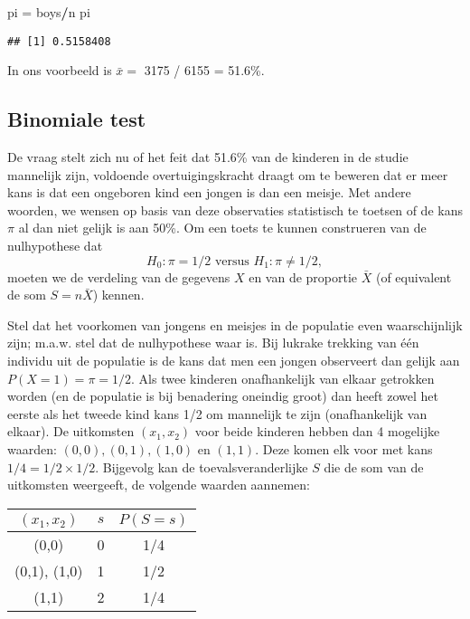 \documentclass[12pt,dutch,coursenotes]{book}
\newenvironment{Shaded}{\begin{snugshade}}{\end{snugshade}}
\newcommand{\StringTok}[1]{\textcolor[rgb]{0.31,0.60,0.02}{#1}}
\newcommand{\OperatorTok}[1]{\textcolor[rgb]{0.81,0.36,0.00}{\textbf{#1}}}
\newcommand{\NormalTok}[1]{#1}
\theoremstyle{definition}
\theoremstyle{definition}
\theoremstyle{definition}
\theoremstyle{remark}
\begin{document}
\begin{Shaded}
\begin{Highlighting}[]
\NormalTok{pi =}\StringTok{ }\NormalTok{boys}\OperatorTok{/}\NormalTok{n}
\NormalTok{pi}
\end{Highlighting}
\end{Shaded}

\begin{verbatim}
## [1] 0.5158408
\end{verbatim}

In ons voorbeeld is \(\bar x =\) 3175 / 6155 = 51.6\%.

\subsection{Binomiale test}\label{subsec:binom}

De vraag stelt zich nu of het feit dat 51.6\% van de kinderen in de
studie mannelijk zijn, voldoende overtuigingskracht draagt om te beweren
dat er meer kans is dat een ongeboren kind een jongen is dan een meisje.
Met andere woorden, we wensen op basis van deze observaties statistisch
te toetsen of de kans \(\pi\) al dan niet gelijk is aan 50\%. Om een
toets te kunnen construeren van de nulhypothese dat
\[H_0: \pi=1/2 \text{ versus } H_1: \pi\neq 1/2,\] moeten we de
verdeling van de gegevens \(X\) en van de proportie \(\bar X\) (of
equivalent de som \(S=n\bar X\)) kennen.

Stel dat het voorkomen van jongens en meisjes in de populatie even
waarschijnlijk zijn; m.a.w. stel dat de nulhypothese waar is. Bij
lukrake trekking van één individu uit de populatie is de kans dat men
een jongen observeert dan gelijk aan \(P(X=1) = \pi = 1/2.\) Als twee
kinderen onafhankelijk van elkaar getrokken worden (en de populatie is
bij benadering oneindig groot) dan heeft zowel het eerste als het tweede
kind kans 1/2 om mannelijk te zijn (onafhankelijk van elkaar). De
uitkomsten \((x_1, x_2)\) voor beide kinderen hebben dan 4 mogelijke
waarden: \((0,0), (0,1),(1,0)\) en \((1,1).\) Deze komen elk voor met
kans \(1/4 = 1/2 \times 1/2\). Bijgevolg kan de toevalsveranderlijke
\(S\) die de som van de uitkomsten weergeeft, de volgende waarden
aannemen:

\begin{longtable}[]{@{}ccc@{}}
\toprule
\((x_1,x_2)\) & \(s\) & \(P(S = s)\)\tabularnewline
\midrule
\endhead
(0,0) & 0 & 1/4\tabularnewline
(0,1), (1,0) & 1 & 1/2\tabularnewline
(1,1) & 2 & 1/4\tabularnewline
\bottomrule
\end{longtable}
\end{document}
